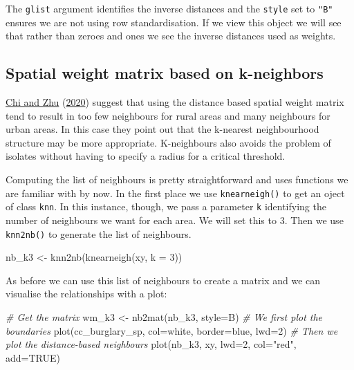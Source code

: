 \documentclass[
  krantz2]{krantz}
\makeatletter
\newenvironment{Shaded}{\begin{snugshade}}{\end{snugshade}}
\newcommand{\AttributeTok}[1]{\textcolor[rgb]{0.61,0.61,0.61}{#1}}
\newcommand{\CommentTok}[1]{\textcolor[rgb]{0.37,0.37,0.37}{\textit{#1}}}
\newcommand{\ConstantTok}[1]{\textcolor[rgb]{0,0,0}{#1}}
\newcommand{\DecValTok}[1]{\textcolor[rgb]{0.06,0.06,0.06}{#1}}
\newcommand{\FunctionTok}[1]{\textcolor[rgb]{0,0,0}{#1}}
\newcommand{\NormalTok}[1]{#1}
\newcommand{\OtherTok}[1]{\textcolor[rgb]{0.37,0.37,0.37}{#1}}
\newcommand{\StringTok}[1]{\textcolor[rgb]{0.5,0.5,0.5}{#1}}
\newenvironment{kframe}{%
\medskip{}
\setlength{\fboxsep}{.8em}
 \def\at@end@of@kframe{}%
 \ifinner\ifhmode%
  \def\at@end@of@kframe{\end{minipage}}%
  \begin{minipage}{\columnwidth}%
 \fi\fi%
 \def\FrameCommand##1{\hskip\@totalleftmargin \hskip-\fboxsep
 \colorbox{shadecolor}{##1}\hskip-\fboxsep
     \hskip-\linewidth \hskip-\@totalleftmargin \hskip\columnwidth}%
 \MakeFramed {\advance\hsize-\width
   \@totalleftmargin\z@ \linewidth\hsize
   \@setminipage}}%
 {\par\unskip\endMakeFramed%
 \at@end@of@kframe}
\renewenvironment{Shaded}{\begin{kframe}}{\end{kframe}}
\makeatother
\begin{document}
The \texttt{glist} argument identifies the inverse distances and the \texttt{style} set to \texttt{"B"} ensures we are not using row standardisation. If we view this object we will see that rather than zeroes and ones we see the inverse distances used as weights.

\hypertarget{spatial-weight-matrix-based-on-k-neighbors}{%
\subsection{Spatial weight matrix based on k-neighbors}\label{spatial-weight-matrix-based-on-k-neighbors}}

\protect\hyperlink{ref-Chi_2020}{Chi and Zhu} (\protect\hyperlink{ref-Chi_2020}{2020}) suggest that using the distance based spatial weight matrix tend to result in too few neighbours for rural areas and many neighbours for urban areas. In this case they point out that the k-nearest neighbourhood structure may be more appropriate. K-neighbours also avoids the problem of isolates without having to specify a radius for a critical threshold.

Computing the list of neighbours is pretty straightforward and uses functions we are familiar with by now. In the first place we use \texttt{knearneigh()} to get an oject of class \texttt{knn}. In this instance, though, we pass a parameter \texttt{k} identifying the number of neighbours we want for each area. We will set this to 3. Then we use \texttt{knn2nb()} to generate the list of neighbours.

\begin{Shaded}
\begin{Highlighting}[]
\NormalTok{nb\_k3 }\OtherTok{\textless{}{-}} \FunctionTok{knn2nb}\NormalTok{(}\FunctionTok{knearneigh}\NormalTok{(xy, }\AttributeTok{k =} \DecValTok{3}\NormalTok{))}
\end{Highlighting}
\end{Shaded}

As before we can use this list of neighbours to create a matrix and we can visualise the relationships with a plot:

\begin{Shaded}
\begin{Highlighting}[]
\CommentTok{\# Get the matrix}
\NormalTok{wm\_k3 }\OtherTok{\textless{}{-}} \FunctionTok{nb2mat}\NormalTok{(nb\_k3, }\AttributeTok{style=}\StringTok{\textquotesingle{}B\textquotesingle{}}\NormalTok{)}
\CommentTok{\# We first plot the boundaries}
\FunctionTok{plot}\NormalTok{(cc\_burglary\_sp, }\AttributeTok{col=}\StringTok{\textquotesingle{}white\textquotesingle{}}\NormalTok{, }\AttributeTok{border=}\StringTok{\textquotesingle{}blue\textquotesingle{}}\NormalTok{, }\AttributeTok{lwd=}\DecValTok{2}\NormalTok{)}
\CommentTok{\# Then we plot the distance{-}based neighbours}
\FunctionTok{plot}\NormalTok{(nb\_k3, xy, }\AttributeTok{lwd=}\DecValTok{2}\NormalTok{, }\AttributeTok{col=}\StringTok{"red"}\NormalTok{, }\AttributeTok{add=}\ConstantTok{TRUE}\NormalTok{)}
\end{Highlighting}
\end{Shaded}
\end{document}
